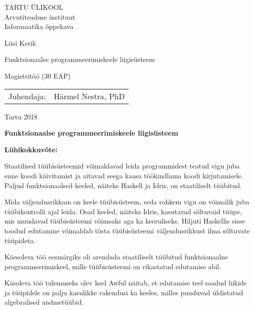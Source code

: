 \documentclass[12pt]{article}
\def\pealkiri{Funktsionaalse programmeerimiskeele liigisüsteem}
\begin{document}
  \thispagestyle{empty}
  \begin{center}
    \large
      TARTU ÜLIKOOL\\
      Arvutiteaduse instituut\\
      Informaatika õppekava

    \vspace{25mm}

    \Large
      Liisi Kerik

    \vspace{4mm}

    \huge
      \pealkiri

    \vspace{20mm}

    \Large
      Magistritöö (30 EAP)
  \end{center}

  \vspace{2mm}

  \begin{flushright}
    \begin{tabular}{rl} 
      Juhendaja: & Härmel Nestra, PhD
    \end{tabular}
  \end{flushright}
  \vfill
  \centerline{Tartu 2018}
  \newpage
  \noindent
  \textbf{\large\pealkiri}

  \vspace*{1ex}

  \noindent
  \textbf{Lühikokkuvõte:} 

  \noindent
  Staatilised tüübisüsteemid võimaldavad leida programmidest teatud vigu juba enne koodi käivitamist ja aitavad seega kaasa töökindlama koodi kirjutamisele. Paljud funktsionaalsed keeled, näiteks Haskell ja Idris, on staatiliselt tüübitud.

  Mida väljendusrikkam on keele tüübisüsteem, seda rohkem vigu on võimalik juba tüübikontrolli ajal leida. Osad keeled, näiteks Idris, kasutavad sõltuvaid tüüpe, mis muudavad tüübisüsteemi võimsaks aga ka keeruliseks. Hiljuti Haskellis sisse toodud edutamine võimaldab tõsta tüübisüsteemi väljendusrikkust ilma sõltuvate tüüpideta.

  Käesoleva töö eesmärgiks oli arendada staatiliselt tüübitud funktsionaalne programmeerimiskeel, mille tüübisüsteemi on rikastatud edutamise abil.

  Käsoleva töö tulemuseks olev keel Awful näitab, et edutamise teel saadud liikide ja tüüpidele on palju kasulikke rakendusi ka keeles, milles puuduvad üldistatud algebralised andmetüübid.
\end{document}
